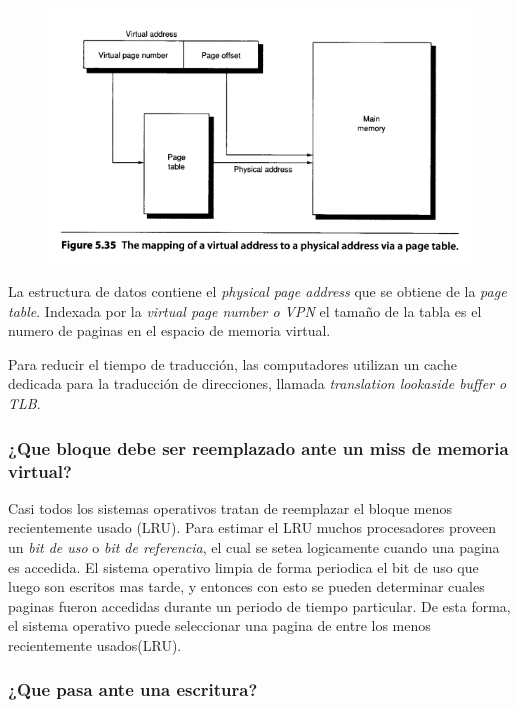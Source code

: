 \documentclass{article}
\begin{document}
\begin{figure}[h!]
    \includegraphics[width=\linewidth]{imagenes/MapeoMemoriaVirtual.png}
\end{figure}

La estructura de datos contiene el \textit{physical page address} que se obtiene de la \textit{page table}. Indexada por la \textit{virtual page number o VPN} el tamaño de la tabla es el numero de paginas en el espacio de memoria virtual.

Para reducir el tiempo de traducción, las computadores utilizan un cache dedicada para la traducción de direcciones, llamada \textit{translation lookaside buffer o TLB}.

\newpage
\subsubsection{¿Que bloque debe ser reemplazado ante un miss de memoria virtual?}

Casi todos los sistemas operativos tratan de reemplazar el bloque menos recientemente usado (LRU). Para estimar el LRU muchos procesadores proveen un \textit{bit de uso} o \textit{bit de referencia}, el cual se setea logicamente cuando una pagina es accedida.
El sistema operativo limpia de forma periodica el bit de uso que luego son escritos mas tarde, y entonces con esto se pueden determinar cuales paginas fueron accedidas durante un periodo de tiempo particular. De esta forma, el sistema operativo puede seleccionar una pagina de entre los menos recientemente usados(LRU).

\subsubsection{¿Que pasa ante una escritura?}
\end{document}
